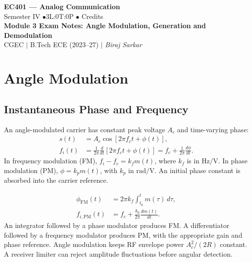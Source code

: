 \documentclass[12pt,a4paper]{article}
\begin{document}
\begin{center}
  {\LARGE\bfseries\color{myred} EC401 --- Analog Communication}\\[5pt]
  {\normalsize\color{mydark} Semester IV \quad$\bullet$\quad 3L:0T:0P \quad$\bullet$ Credits}\\[3pt]
  {\normalsize\color{myteal}\textbf{Module 3 Exam Notes: Angle Modulation, Generation and Demodulation}}\\[3pt]
  {\small\color{mydark} CGEC \;$|$\; B.Tech ECE (2023--27) \;$|$\; \textit{Biraj Sarkar}}
\end{center}
\vspace{2pt}
\noindent{\color{myred}\rule{\linewidth}{1.5pt}}
\vspace{2pt}

\hypersetup{linkcolor=mydark}
\tableofcontents
\hypersetup{linkcolor=myteal}
\newpage

\section{Angle Modulation}
\subsection{Instantaneous Phase and Frequency}

\begin{tcolorbox}[defbox, title={FM and PM}]
An angle-modulated carrier has constant peak voltage $A_c$ and time-varying phase:
\[
\begin{aligned}
 s(t)&=A_c\cos[2\pi f_ct+\phi(t)],\\
 f_i(t)&=\frac{1}{2\pi}\frac{d}{dt}[2\pi f_ct+\phi(t)]
        =f_c+\frac{1}{2\pi}\frac{d\phi}{dt}.
\end{aligned}
\]
In frequency modulation (FM), $f_i-f_c=k_fm(t)$, where $k_f$ is in $\mathrm{Hz/V}$. In phase modulation (PM), $\phi=k_pm(t)$, with $k_p$ in $\mathrm{rad/V}$. An initial phase constant is absorbed into the carrier reference.
\end{tcolorbox}

\[
\begin{aligned}
 \phi_{\mathrm{FM}}(t)&=2\pi k_f\int_{t_0}^{t}m(\tau)\,d\tau,\\
 f_{i,\mathrm{PM}}(t)&=f_c+\frac{k_p}{2\pi}\frac{dm(t)}{dt}.
\end{aligned}
\]
An integrator followed by a phase modulator produces FM. A differentiator followed by a frequency modulator produces PM, with the appropriate gain and phase reference. Angle modulation keeps RF envelope power $A_c^2/(2R)$ constant. A receiver limiter can reject amplitude fluctuations before angular detection.
\end{document}
